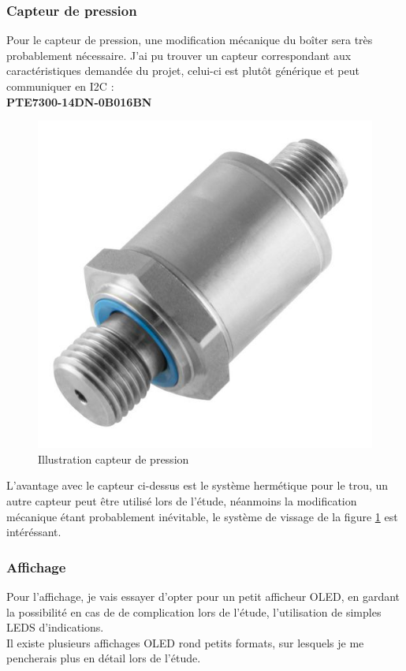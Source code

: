 {\clearpage

\subsubsection{Capteur de pression}
{
Pour le capteur de pression, une modification mécanique du boîter sera très probablement nécessaire. J'ai pu trouver un capteur correspondant aux caractéristiques demandée du projet, celui-ci est plutôt générique et peut communiquer en I2C : \\
\textbf{PTE7300-14DN-0B016BN}

\begin{figure}[h] 
    \centering
    \includegraphics[width=.4\textwidth]{Figures/Capteur-pression}
    \caption{Illustration capteur de pression}
    \label{fig:CaptPress}
\end{figure}

L'avantage avec le capteur ci-dessus est le système hermétique pour le trou, un autre capteur peut être utilisé lors de l'étude, néanmoins la modification mécanique étant probablement inévitable, le système de vissage de la figure \ref{fig:CaptPress} est intéréssant.

}

\subsubsection{Affichage}
{
    Pour l'affichage, je vais essayer d'opter pour un petit afficheur OLED, en gardant la possibilité en cas de de complication lors de l'étude, l'utilisation de simples LEDS d'indications.
    \\
    Il existe plusieurs affichages OLED rond petits formats, sur lesquels je me pencherais plus en détail lors de l'étude.
    


}

\newpage
}

